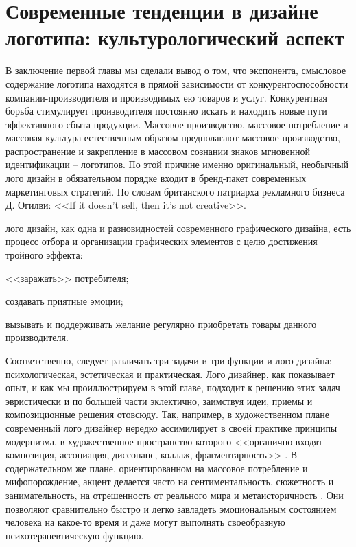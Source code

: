 \section{Современные тенденции в дизайне логотипа: культурологический аспект}

В заключение первой главы мы сделали вывод о том, что экспонента, смысловое содержание логотипа
находятся в прямой зависимости от конкурентоспособности компании-производителя  и производимых ею
товаров и услуг.  Конкурентная борьба стимулирует производителя постоянно искать и находить новые
пути эффективного сбыта продукции. Массовое производство, массовое потребление и массовая культура
естественным образом предполагают массовое производство, распространение и закрепление в массовом
сознании знаков мгновенной идентификации -- логотипов. По этой причине именно оригинальный, необычный
лого дизайн в обязательном порядке входит в бренд-пакет современных маркетинговых стратегий. По
словам британского патриарха рекламного бизнеса Д. Огилви: <<If it doesn’t sell, then
it’s not creative>>.

лого дизайн, как одна и разновидностей современного графического дизайна, есть процесс отбора и
организации графических элементов с целю достижения тройного эффекта:
\begin{enumerate*}[label=\asbuk*)]
\item <<заражать>> потребителя;
\item создавать приятные эмоции;
\item вызывать и поддерживать желание регулярно приобретать товары данного производителя.
\end{enumerate*}

Соответственно, следует различать три задачи и три функции и лого дизайна:
психологическая, эстетическая и практическая. Лого дизайнер, как показывает опыт, и как мы
проиллюстрируем в этой главе, подходит к решению этих задач эвристически и по большей части
эклектично, заимствуя идеи, приемы и композиционные решения отовсюду. Так, например, в художественном плане современный лого дизайнер нередко ассимилирует в своей практике принципы модернизма, в художественное пространство которого <<органично входят композиция, ассоциация, диссонанс, коллаж, фрагментарность>> \autocite[][322]{edoshina2002} . В содержательном же плане,
ориентированном на массовое потребление и мифопорождение, акцент делается часто на
сентиментальность, сюжетность и занимательность, на отрешенность от реального мира и
метаисторичность \autocite{book:konradova}. Они позволяют сравнительно быстро и легко завладеть эмоциональным состоянием человека на какое-то время и даже могут выполнять своеобразную психотерапевтическую функцию.

